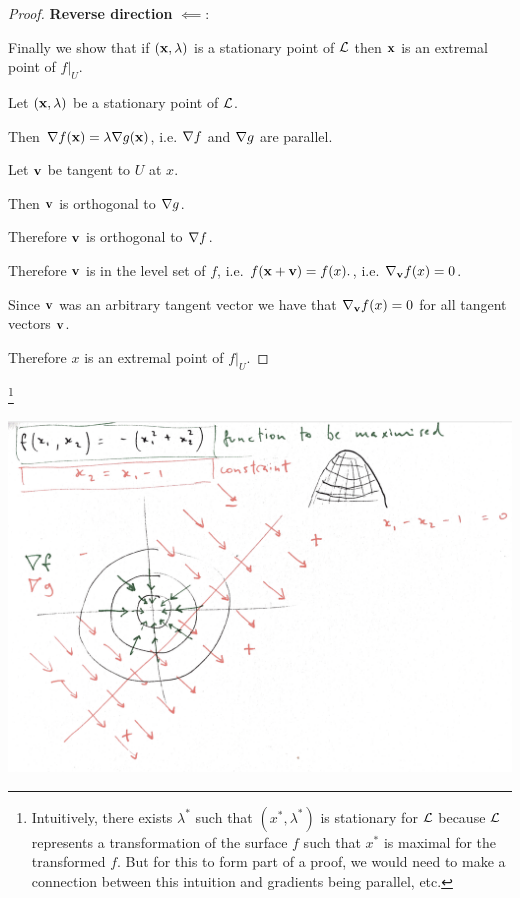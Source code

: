 \begin{proof}
  {\bf Reverse direction} $\impliedby$:

  Finally we show that if $(\mathbf x, \lambda)$ is a stationary point of $\mathcal{L}$ then $\mathbf x$ is an extremal point of $f|_U$.

  Let $(\mathbf x, \lambda)$ be a stationary point of $\mathcal{L}$.

  Then $\nabla f(\mathbf x) = \lambda\nabla g(\mathbf x)$, i.e. $\nabla f$ and $\nabla g$ are parallel.

  Let $\mathbf v$ be tangent to $U$ at $x$.

  Then $\mathbf v$ is orthogonal to $\nabla g$.

  Therefore $\mathbf v$ is orthogonal to $\nabla f$.

  Therefore $\mathbf v$ is in the level set of $f$, i.e. $f(\mathbf x + \mathbf v) = f(x).$, i.e. $\nabla_\mathbf v f(x) = 0$.

  Since $\mathbf v$ was an arbitrary tangent vector we have that $\nabla_\mathbf v f(x) = 0$ for all tangent vectors $\mathbf v$.

  Therefore $x$ is an extremal point of $f|_U$.
\end{proof}


\footnote{Intuitively, there exists $\lambda^*$ such that $(x^*, \lambda^*)$ is stationary for
  $\mathcal{L}$ because $\mathcal{L}$ represents a transformation of the surface $f$ such that $x^*$ is maximal for
  the transformed $f$. But for this to form part of a proof, we would need to make a connection
  between this intuition and gradients being parallel, etc.}

\begin{mdframed}
\includegraphics[width=400pt]{img/lagrange-multiplier-diag-1.png}
\end{mdframed}

